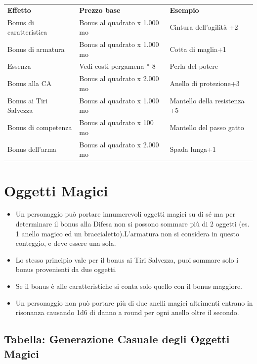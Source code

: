 \documentclass[a4paper,11pt,twoside,openany]{book}
\begin{document}
\begin{tabular}{lll}
	\toprule
	\textbf{Effetto}        & \textbf{Prezzo base}         & \textbf{Esempio}\\
	Bonus di caratteristica & Bonus al quadrato x 1.000 mo & Cintura dell'agilità +2\\
	Bonus di armatura       & Bonus al quadrato x 1.000 mo & Cotta di maglia+1\\
	Essenza                 & Vedi costi pergamena {*} 8   & Perla del potere\\
	Bonus alla CA           & Bonus al quadrato x 2.000 mo & Anello di protezione+3\\
	Bonus ai Tiri Salvezza  & Bonus al quadrato x 1.000 mo & Mantello della resistenza +5\\
	Bonus di competenza     & Bonus al quadrato x 100 mo   & Mantello del passo gatto\\
	Bonus dell'arma         & Bonus al quadrato x 2.000 mo & Spada lunga+1\\
\end{tabular}

\pagebreak

\section{Oggetti Magici}

\label{oggetti-magici}
\begin{itemize}
	\item
	      Un personaggio può portare innumerevoli oggetti magici su di sé ma per determinare il bonus alla Difesa non si possono sommare più di 2 oggetti (es. 1 anello magico ed un braccialetto).L'armatura non si considera in questo conteggio, e deve essere una sola.
	\item
	      Lo stesso principio vale per il bonus ai Tiri Salvezza, puoi sommare solo i bonus provenienti da due oggetti.
	\item
	      Se il bonus è alle caratteristiche si conta solo quello con il bonus maggiore.
	\item
	      Un personaggio non può portare più di due anelli magici altrimenti
	      entrano in risonanza causando 1d6 di danno a round per ogni anello oltre il secondo.
\end{itemize}



\subsection{Tabella: Generazione Casuale degli Oggetti Magici}
\end{document}
